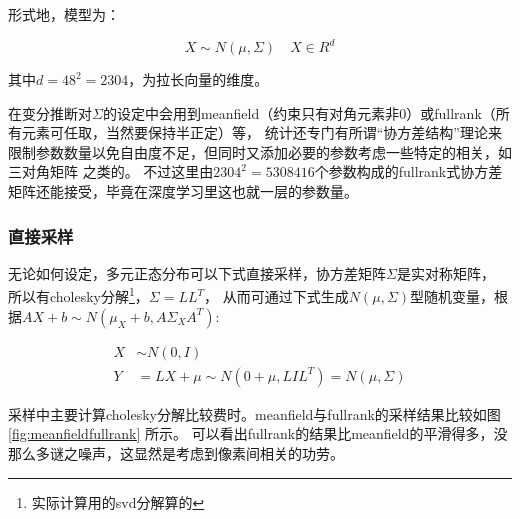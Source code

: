 \documentclass[twocolumn,11pt]{ctexart}
\begin{document}
形式地，模型为：

$$
X \sim N(\mu, \Sigma) \quad X \in R^d
$$

其中$d=48^2=2304$，为拉长向量的维度。

在变分推断对$\Sigma$的设定中会用到meanfield（约束只有对角元素非0）或fullrank（所有元素可任取，当然要保持半正定）等，
统计还专门有所谓“协方差结构”理论来限制参数数量以免自由度不足，但同时又添加必要的参数考虑一些特定的相关，如三对角矩阵
之类的。
不过这里由$2304^2 = 5308416$个参数构成的fullrank式协方差矩阵还能接受，毕竟在深度学习里这也就一层的参数量。

\subsubsection{直接采样}

无论如何设定，多元正态分布可以下式直接采样，协方差矩阵$\Sigma$是实对称矩阵，
所以有cholesky分解\footnote{实际计算用的svd分解算的}，$\Sigma = LL^T$，
从而可通过下式生成$N(\mu,\Sigma)$型随机变量，根据$AX+b \sim N(\mu_X + b, A\Sigma_XA^T)$:

\begin{align*}
    X &\sim N(0, I) \\
    Y &= L X + \mu \sim N(0+\mu,LIL^T) = N(\mu, \Sigma)
\end{align*}

采样中主要计算cholesky分解比较费时。meanfield与fullrank的采样结果比较如图 \ref{fig:meanfieldfullrank} 所示。
可以看出fullrank的结果比meanfield的平滑得多，没那么多谜之噪声，这显然是考虑到像素间相关的功劳。
\end{document}
